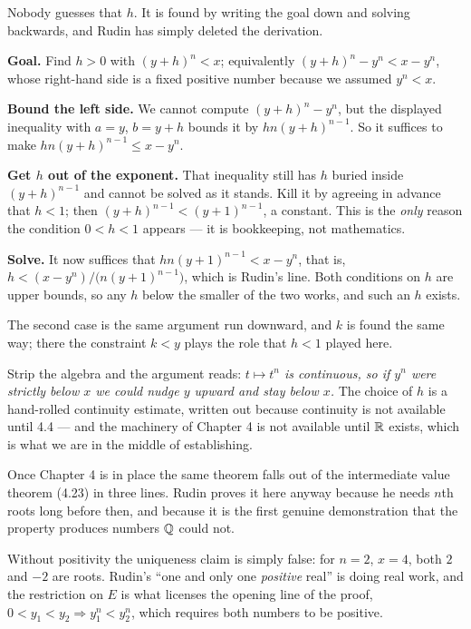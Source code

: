 \documentclass[11pt,twoside]{article}
\begin{document}
\begin{unpack}
Nobody guesses that $h$. It is found by writing the goal down and solving
backwards, and Rudin has simply deleted the derivation.

\smallskip
\textbf{Goal.} Find $h>0$ with $(y+h)^n < x$; equivalently
$(y+h)^n - y^n < x - y^n$, whose right-hand side is a fixed positive number
because we assumed $y^n < x$.

\smallskip
\textbf{Bound the left side.} We cannot compute $(y+h)^n - y^n$, but the
displayed inequality with $a = y$, $b = y+h$ bounds it by $hn(y+h)^{n-1}$. So it
suffices to make $hn(y+h)^{n-1} \le x - y^n$.

\smallskip
\textbf{Get $h$ out of the exponent.} That inequality still has $h$ buried
inside $(y+h)^{n-1}$ and cannot be solved as it stands. Kill it by agreeing in
advance that $h < 1$; then $(y+h)^{n-1} < (y+1)^{n-1}$, a constant. This is the
\emph{only} reason the condition $0 < h < 1$ appears --- it is bookkeeping, not
mathematics.

\smallskip
\textbf{Solve.} It now suffices that $hn(y+1)^{n-1} < x - y^n$, that is,
$h < (x-y^n)/\bigl(n(y+1)^{n-1}\bigr)$, which is Rudin's line. Both conditions
on $h$ are upper bounds, so any $h$ below the smaller of the two works, and such
an $h$ exists.

\smallskip
The second case is the same argument run downward, and $k$ is found the same
way; there the constraint $k < y$ plays the role that $h < 1$ played here.
\end{unpack}

\begin{deeper}
Strip the algebra and the argument reads: \emph{$t \mapsto t^n$ is continuous,
so if $y^n$ were strictly below $x$ we could nudge $y$ upward and stay below
$x$.} The choice of $h$ is a hand-rolled continuity estimate, written out
because continuity is not available until 4.4 --- and the machinery of Chapter 4
is not available until $\mathbb{R}$ exists, which is what we are in the middle of
establishing.

Once Chapter 4 is in place the same theorem falls out of the intermediate value
theorem (4.23) in three lines. Rudin proves it here anyway because he needs
$n$th roots long before then, and because it is the first genuine demonstration
that the \lub{} property produces numbers $\mathbb{Q}$ could not.
\end{deeper}

\begin{pitfall}
Without positivity the uniqueness claim is simply false: for $n = 2$, $x = 4$,
both $2$ and $-2$ are roots. Rudin's ``one and only one \emph{positive} real''
is doing real work, and the restriction on $E$ is what licenses the opening line
of the proof, $0 < y_1 < y_2 \Rightarrow y_1^n < y_2^n$, which requires both
numbers to be positive.
\end{pitfall}
\end{document}
